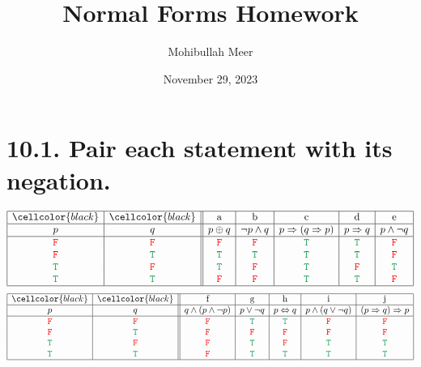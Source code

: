 \documentclass{article}
\title{Normal Forms Homework}
\author{Mohibullah Meer}
\date{November 29, 2023}
\begin{document}
\maketitle
\section*{10.1. Pair each statement with its negation.}
\[\begin{array}{|c|c||c|c|c|c|c|}
\hline
\cellcolor{black}&\cellcolor{black}&\text{a}&\text{b}&\text{c}&\text{d}&\text{e}\\
\hline
p&q&p\oplus q&\neg p\land q&p\Rightarrow(q\Rightarrow p)&p\Rightarrow q&p\land\neg q\\
\hline
\textcolor{red}{\tt{F}}&\textcolor{red}{\tt{F}}&\textcolor{red}{\tt{F}}&\textcolor{red}{\tt{F}}&\textcolor{ForestGreen}{\tt{T}}&\textcolor{ForestGreen}{\tt{T}}&\textcolor{red}{\tt{F}}\\
\textcolor{red}{\tt{F}}&\textcolor{ForestGreen}{\tt{T}}&\textcolor{ForestGreen}{\tt{T}}&\textcolor{ForestGreen}{\tt{T}}&\textcolor{ForestGreen}{\tt{T}}&\textcolor{ForestGreen}{\tt{T}}&\textcolor{red}{\tt{F}}\\
\textcolor{ForestGreen}{\tt{T}}&\textcolor{red}{\tt{F}}&\textcolor{ForestGreen}{\tt{T}}&\textcolor{red}{\tt{F}}&\textcolor{ForestGreen}{\tt{T}}&\textcolor{red}{\tt{F}}&\textcolor{ForestGreen}{\tt{T}}\\
\textcolor{ForestGreen}{\tt{T}}&\textcolor{ForestGreen}{\tt{T}}&\textcolor{red}{\tt{F}}&\textcolor{red}{\tt{F}}&\textcolor{ForestGreen}{\tt{T}}&\textcolor{ForestGreen}{\tt{T}}&\textcolor{red}{\tt{F}}\\
\hline
\end{array}\]
\[\begin{array}{|c|c||c|c|c|c|c|}
\hline
\cellcolor{black}&\cellcolor{black}&\text{f}&\text{g}&\text{h}&\text{i}&\text{j}\\
\hline
p&q&q\land(p\land\neg p)&p\lor\neg q&p\Leftrightarrow q&p\land(q\lor\neg q)&(p\Rightarrow q)\Rightarrow p\\
\hline
\textcolor{red}{\tt{F}}&\textcolor{red}{\tt{F}}&\textcolor{red}{\tt{F}}&\textcolor{ForestGreen}{\tt{T}}&\textcolor{ForestGreen}{\tt{T}}&\textcolor{red}{\tt{F}}&\textcolor{red}{\tt{F}}\\
\textcolor{red}{\tt{F}}&\textcolor{ForestGreen}{\tt{T}}&\textcolor{red}{\tt{F}}&\textcolor{red}{\tt{F}}&\textcolor{red}{\tt{F}}&\textcolor{red}{\tt{F}}&\textcolor{red}{\tt{F}}\\
\textcolor{ForestGreen}{\tt{T}}&\textcolor{red}{\tt{F}}&\textcolor{red}{\tt{F}}&\textcolor{ForestGreen}{\tt{T}}&\textcolor{red}{\tt{F}}&\textcolor{ForestGreen}{\tt{T}}&\textcolor{ForestGreen}{\tt{T}}\\
\textcolor{ForestGreen}{\tt{T}}&\textcolor{ForestGreen}{\tt{T}}&\textcolor{red}{\tt{F}}&\textcolor{ForestGreen}{\tt{T}}&\textcolor{ForestGreen}{\tt{T}}&\textcolor{ForestGreen}{\tt{T}}&\textcolor{ForestGreen}{\tt{T}}\\
\hline
\end{array}\]
\end{document}
